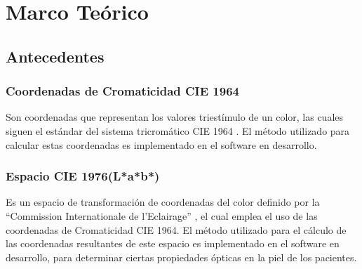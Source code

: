 \documentclass[conference]{IEEEtran}
\renewcommand{\arraystretch}{1.3}
\begin{document}
%



\section{Marco Te\'{o}rico}

	\subsection{Antecedentes}
		\subsubsection{Coordenadas de Cromaticidad CIE 1964}
			Son coordenadas que representan los valores triest\'{i}mulo de un color, las cuales siguen el est\'{a}ndar del sistema tricrom\'{a}tico CIE 1964 \cite{CIE}. El m\'{e}todo utilizado para calcular estas coordenadas \cite{Schanda} es implementado en el software en desarrollo.
		
		\subsubsection{Espacio CIE 1976(L*a*b*)}
			Es un espacio de transformaci\'{o}n de coordenadas del color definido por la ``Commission Internationale de l'Eclairage'' \cite{CIE}, el cual emplea el uso de las coordenadas de Cromaticidad CIE 1964. El m\'{e}todo utilizado para el c\'{a}lculo de las coordenadas resultantes de este espacio \cite{Schanda} es implementado en el software en desarrollo, para determinar ciertas propiedades \'{o}pticas en la piel de los pacientes.
	
\end{document}
